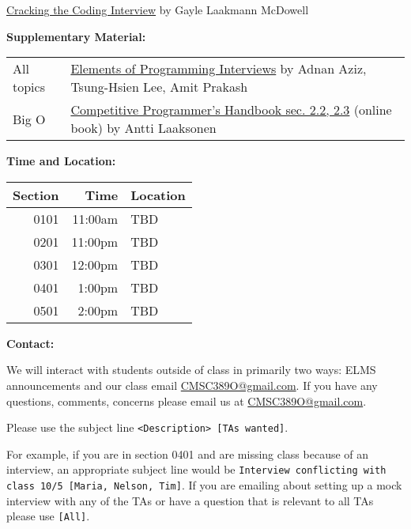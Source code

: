\documentclass[12pt]{article}
\begin{document}
\noindent\href{https://www.amazon.com/Cracking-Coding-Interview-Programming-Questions/dp/0984782850/}{Cracking the Coding Interview}
{\small by Gayle Laakmann McDowell} \medskip

\noindent\textbf{Supplementary Material: }

\begin{table}[hbt!]
  \begin{tabular}{@{}ll}
    All topics & \href{https://www.amazon.com/Elements-Programming-Interviews-Python-Insiders/dp/1537713949}{Elements of Programming Interviews} {\small by Adnan Aziz, Tsung-Hsien Lee, Amit Prakash} \\
    Big O & \href{https://cses.fi/book/index.html}{Competitive Programmer's Handbook sec. 2.2, 2.3} {\small (online book) by Antti Laaksonen} \\ 
  \end{tabular}
\end{table}


\medskip

\noindent\textbf{Time and Location:}
\begin{table}[H]
  \begin{tabular}{rrl}
    Section & Time    & Location  \\
    \hline
    0101 & 11:00am & TBD \\
    0201 & 11:00pm & TBD \\
    0301 & 12:00pm & TBD \\
    0401 & 1:00pm  & TBD \\
    0501 & 2:00pm  & TBD
  \end{tabular}
\end{table}
\medskip
\newpage %
\noindent\textbf{Contact: }

\noindent We will interact with students outside of class in primarily two ways:
ELMS announcements and our class email \href{mailto:CMSC389O@gmail.com}{CMSC389O@gmail.com}.
If you have any questions, comments, concerns please email us at \href{mailto:CMSC389O@gmail.com}{CMSC389O@gmail.com}.

Please use the subject line \texttt{<Description> [TAs wanted]}.

For example, if you are in section 0401 and are missing class because of an interview,
an appropriate subject line would be
\texttt{Interview conflicting with class 10/5 [Maria, Nelson, Tim]}.
If you are emailing about setting up a mock interview with any of the TAs
or have a question that is relevant to all TAs please use \texttt{[All]}.
\end{document}
